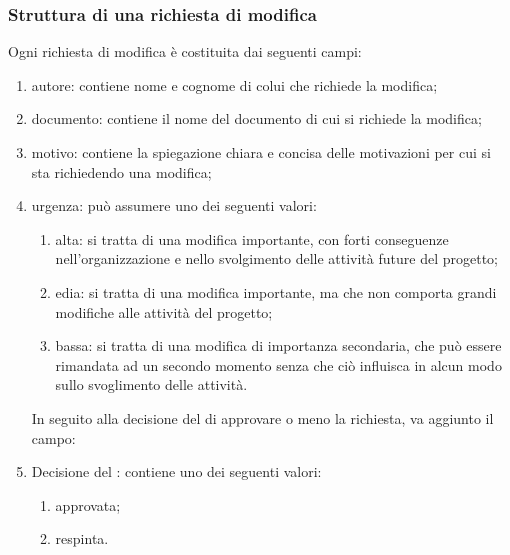 		\subsubsection{Struttura di una richiesta di modifica}
			Ogni richiesta di modifica è costituita dai seguenti campi:
			\begin{enumerate}
				\item autore: contiene nome e cognome di colui che richiede la modifica;
				\item documento: contiene il nome del documento di cui si richiede la modifica;
				\item motivo: contiene la spiegazione chiara e concisa delle motivazioni per cui si sta richiedendo una modifica;
				\item urgenza: può assumere uno dei seguenti valori:
					\begin{enumerate}
						\item alta: si tratta di una modifica importante, con forti conseguenze nell'organizzazione e nello svolgimento delle attività future del progetto;
						\item edia: si tratta di una modifica importante, ma che non comporta grandi modifiche alle attività del progetto;
						\item bassa: si tratta di una modifica di importanza secondaria, che può essere rimandata ad un secondo momento senza che ciò influisca in alcun modo sullo svoglimento delle attività.
					\end{enumerate}
			In seguito alla decisione del  di approvare o meno la richiesta, va aggiunto il campo:
				\item Decisione del : contiene uno dei seguenti valori:
					\begin{enumerate}
						\item approvata;
						\item respinta.
					\end{enumerate}
			\end{enumerate}
	
